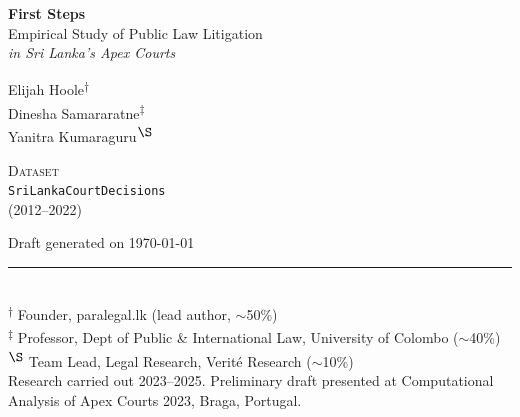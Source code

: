 \begin{titlepage}
\thispagestyle{empty}
\vspace*{0.5cm}
\begin{center}
{\Large\bfseries First Steps\\[0.15cm]}
{\normalsize Empirical Study of Public Law Litigation\\[0.2cm]}
{\small\itshape in Sri Lanka's Apex Courts\\[0.8cm]}

{\small Elijah Hoole\textsuperscript{$\dagger$}\\[0.1cm]
Dinesha Samararatne\textsuperscript{$\ddagger$}\\[0.1cm]
Yanitra Kumaraguru\textsuperscript{$\S$}\\[0.6cm]}

{\scriptsize\scshape Dataset}\\[0.15cm]
{\small\texttt{SriLankaCourtDecisions}\\(2012--2022)\\[0.6cm]}

{\scriptsize Draft generated on \today}
\end{center}
\vfill

\noindent\rule{\textwidth}{0.4pt}\\[0.2cm]
{\tiny
\textsuperscript{$\dagger$} Founder, paralegal.lk (lead author, $\sim$50\%)\\[0.1cm]
\textsuperscript{$\ddagger$} Professor, Dept of Public \& International Law, University of Colombo ($\sim$40\%)\\[0.1cm]
\textsuperscript{$\S$} Team Lead, Legal Research, Verité Research ($\sim$10\%)\\[0.2cm]
Research carried out 2023--2025. Preliminary draft presented at Computational Analysis of Apex Courts 2023, Braga, Portugal.
}
\end{titlepage}
